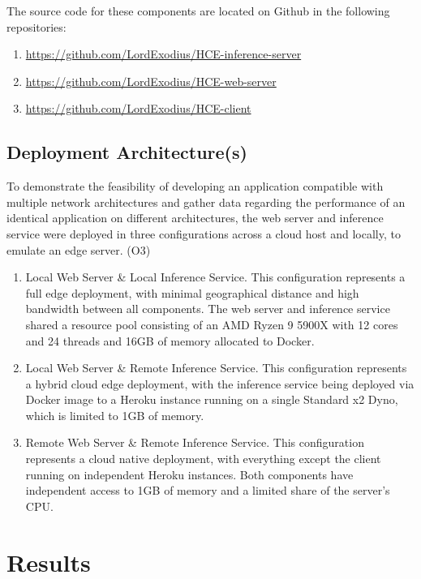 \documentclass[11pt]{article}
\begin{document}
\noindent The source code for these components are located on Github in the following repositories:
\begin{enumerate}
    \item \url{https://github.com/LordExodius/HCE-inference-server}
    \item \url{https://github.com/LordExodius/HCE-web-server}
    \item \url{https://github.com/LordExodius/HCE-client}
\end{enumerate}

\subsection{Deployment Architecture(s)}
To demonstrate the feasibility of developing an application compatible with multiple network 
architectures and gather data regarding the performance of an identical application on different
architectures, the web server and inference service were deployed in three configurations across 
a cloud host and locally, to emulate an edge server. (O3)

\begin{enumerate}
    \item {
        Local Web Server \& Local Inference Service. This configuration represents a full edge 
        deployment, with minimal geographical distance and high bandwidth between all components.
        The web server and inference service shared a resource pool consisting of an AMD Ryzen 9 5900X
        with 12 cores and 24 threads and 16GB of memory allocated to Docker.
    }
    \item {
        Local Web Server \& Remote Inference Service. This configuration represents a hybrid
        cloud edge deployment, with the inference service being deployed via Docker image to a
        Heroku instance running on a single Standard x2 Dyno, which is limited to 1GB of memory.
    }
    \item {
        Remote Web Server \& Remote Inference Service. This configuration represents a cloud native
        deployment, with everything except the client running on independent Heroku instances.
        Both components have independent access to 1GB of memory and a limited share of the server's CPU.
    }
\end{enumerate}



\newpage
\section{Results}
\end{document}

